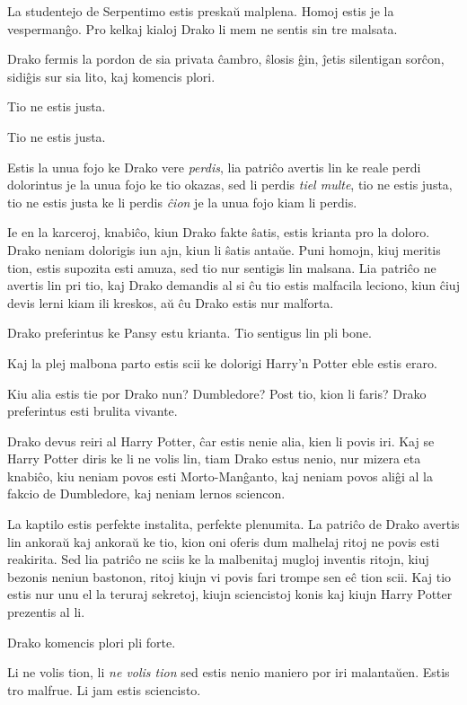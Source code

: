 \later

La studentejo de Serpentimo estis preskaŭ malplena. Homoj estis je la
vespermanĝo. Pro kelkaj kialoj Drako li mem ne sentis sin tre malsata.

Drako fermis la pordon de sia privata ĉambro, ŝlosis ĝin, ĵetis
silentigan sorĉon, sidiĝis sur sia lito, kaj komencis plori.

Tio ne estis justa.

Tio ne estis justa.

Estis la unua fojo ke Drako vere \emph{perdis}, lia patriĉo avertis
lin ke reale perdi dolorintus je la unua fojo ke tio okazas, sed li
perdis \emph{tiel multe}, tio ne estis justa, tio ne estis justa ke li
perdis \emph{ĉion} je la unua fojo kiam li perdis.

Ie en la karceroj, knabiĉo, kiun Drako fakte ŝatis, estis krianta pro
la doloro. Drako neniam dolorigis iun ajn, kiun li ŝatis antaŭe. Puni
homojn, kiuj meritis tion, estis supozita esti amuza, sed tio nur
sentigis lin malsana. Lia patriĉo ne avertis lin pri tio, kaj Drako
demandis al si ĉu tio estis malfacila leciono, kiun ĉiuj devis lerni
kiam ili kreskos, aŭ ĉu Drako estis nur malforta.

Drako preferintus ke Pansy estu krianta. Tio sentigus lin pli bone.

Kaj la plej malbona parto estis scii ke dolorigi Harry'n Potter eble estis eraro.

Kiu alia estis tie por Drako nun? Dumbledore? Post tio, kion li faris? Drako preferintus esti brulita vivante.

Drako devus reiri al Harry Potter, ĉar estis nenie alia, kien li povis
iri. Kaj se Harry Potter diris ke li ne volis lin, tiam Drako estus
nenio, nur mizera eta knabiĉo, kiu neniam povos esti Morto-Manĝanto,
kaj neniam povos aliĝi al la fakcio de Dumbledore, kaj neniam lernos
sciencon.

La kaptilo estis perfekte instalita, perfekte plenumita. La patriĉo de
Drako avertis lin ankoraŭ kaj ankoraŭ ke tio, kion oni oferis dum
malhelaj ritoj ne povis esti reakirita. Sed lia patriĉo ne sciis ke
la malbenitaj mugloj inventis ritojn, kiuj bezonis neniun bastonon,
ritoj kiujn vi povis fari trompe sen eĉ tion scii. Kaj tio estis nur
unu el la teruraj sekretoj, kiujn sciencistoj konis kaj kiujn Harry
Potter prezentis al li.

Drako komencis plori pli forte.

Li ne volis tion, li \emph{ne volis tion} sed estis nenio maniero por iri malantaŭen. Estis tro malfrue. Li jam estis sciencisto.

